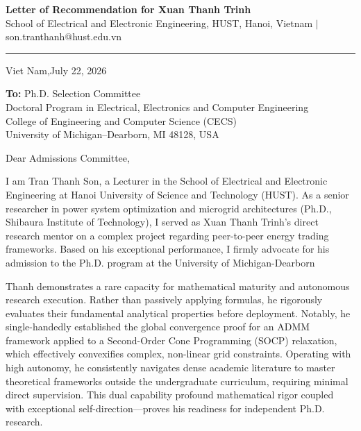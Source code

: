 \documentclass[11pt,letterpaper]{article}
\begin{document}
\begin{center}
{\LARGE \textbf{Letter of Recommendation for Xuan Thanh Trinh}}\\[1.5ex]
{\small School of Electrical and Electronic Engineering, HUST, Hanoi, Vietnam $\vert$ son.tranthanh@hust.edu.vn}
\end{center}
\vspace{-3ex}
\noindent\rule{\textwidth}{0.4pt}
\vspace{-2ex}

\noindent Viet Nam,July 22, 2026

\vspace{0.2ex}

\noindent
\textbf{To:} Ph.D. Selection Committee \\
Doctoral Program in Electrical, Electronics and Computer Engineering \\
College of Engineering and Computer Science (CECS) \\
University of Michigan--Dearborn, MI 48128, USA

\vspace{0.5ex}

\noindent Dear Admissions Committee,

I am Tran Thanh Son, a Lecturer in the School of Electrical and Electronic Engineering at Hanoi University of Science and Technology (HUST). As a senior researcher in power system optimization and microgrid architectures (Ph.D., Shibaura Institute of Technology), I served as Xuan Thanh Trinh's direct research mentor on a complex project regarding peer-to-peer energy trading frameworks. Based on his exceptional performance, I firmly advocate for his admission to the Ph.D. program at the University of Michigan-Dearborn

Thanh demonstrates a rare capacity for mathematical maturity and autonomous research execution. Rather than passively applying formulas, he rigorously evaluates their fundamental analytical properties before deployment. Notably, he single-handedly established the global convergence proof for an ADMM framework applied to a Second-Order Cone Programming (SOCP) relaxation, which effectively convexifies complex, non-linear grid constraints. Operating with high autonomy, he consistently navigates dense academic literature to master theoretical frameworks outside the undergraduate curriculum, requiring minimal direct supervision. This dual capability profound mathematical rigor coupled with exceptional self-direction—proves his readiness for independent Ph.D. research.
\end{document}
